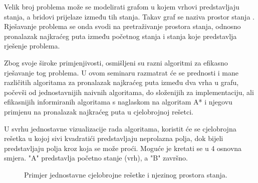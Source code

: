 Velik broj problema može se modelirati grafom u kojem vrhovi predstavljaju stanja, a bridovi prijelaze između tih stanja. Takav graf se naziva prostor stanja .
Rješavanje problema se onda svodi na pretraživanje prostora stanja, odnosno pronalazak najkraćeg puta između početnog stanja i stanja koje predstavlja rješenje problema.


Zbog svoje široke primjenjivosti, osmišljeni su razni algoritmi za efikasno rješavanje tog problema. U ovom seminaru razmatrat će se prednosti i mane različitih algoritama za pronalazak najkraćeg puta između dva vrha u grafu, počevši od jednostavnijih naivnih algoritama,  do složenijih za implementaciju, ali efikasnijih informiranih algoritama s naglaskom na algoritam A* i njegovu primjenu na pronalazak najkraćeg puta u cjelobrojnoj rešetci. 

U svrhu jednostavne vizualizacije rada algoritama, koristit će se cjelobrojna rešetka u kojoj sivi kvadratići predstavljaju neprolazna polja, dok bijeli predstavljaju polja kroz koja se može proći. Moguće je kretati se u 4 osnovna smjera. "A" predstavlja početno stanje (vrh), a "B" završno. 

\begin{figure}[h]
	\centering
	
	\caption{Primjer jednostavne cjelobrojne rešetke i njezinog prostora stanja.} 
\end{figure}



